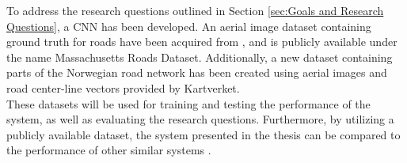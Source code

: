 To address the research questions outlined in Section \ref{sec:Goals and Research Questions}, a \ac{CNN} has been developed. An aerial image dataset containing ground truth for roads have been acquired from \citep{MnihThesis}, and is publicly available under the name Massachusetts Roads Dataset. Additionally, a new dataset containing parts of the Norwegian road network has been created using aerial images and road center-line vectors provided by Kartverket.\\   

These datasets will be used for training and testing the performance of the system, as well as evaluating the research questions. Furthermore, by utilizing a publicly available dataset, the system presented in the thesis can be compared to the performance of other similar systems \citep{Mnih_aerial_images_noisy}\citep{MnihThesis}\citep{saito_building_and_roads}.  